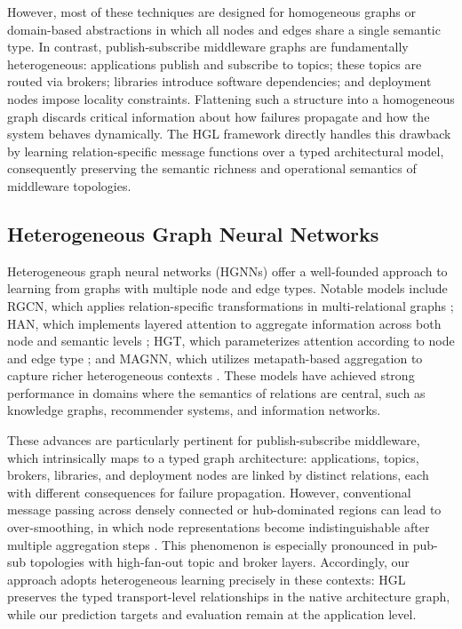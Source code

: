 \documentclass[sigconf,9pt,anonymous]{acmart}
\begin{document}
However, most of these techniques are designed for homogeneous graphs or domain-based abstractions in which all nodes and edges share a single semantic type. In contrast, publish-subscribe middleware graphs are fundamentally heterogeneous: applications publish and subscribe to topics; these topics are routed via brokers; libraries introduce software dependencies; and deployment nodes impose locality constraints. Flattening such a structure into a homogeneous graph discards critical information about how failures propagate and how the system behaves dynamically. The HGL framework directly handles this drawback by learning relation-specific message functions over a typed architectural model, consequently preserving the semantic richness and operational semantics of middleware topologies.

\subsection{Heterogeneous Graph Neural Networks}

Heterogeneous graph neural networks (HGNNs) offer a well-founded approach to learning from graphs with multiple node and edge types. Notable models include RGCN, which applies relation-specific transformations in multi-relational graphs \cite{schlichtkrull2018rgcn}; HAN, which implements layered attention to aggregate information across both node and semantic levels \cite{wang2019han}; HGT, which parameterizes attention according to node and edge type \cite{hu2020hgt}; and MAGNN, which utilizes metapath-based aggregation to capture richer heterogeneous contexts \cite{fu2020magnn}. These models have achieved strong performance in domains where the semantics of relations are central, such as knowledge graphs, recommender systems, and information networks.

These advances are particularly pertinent for publish-subscribe middleware, which intrinsically maps to a typed graph architecture: applications, topics, brokers, libraries, and deployment nodes are linked by distinct relations, each with different consequences for failure propagation. However, conventional message passing across densely connected or hub-dominated regions can lead to over-smoothing, in which node representations become indistinguishable after multiple aggregation steps \cite{li2018deeper}. This phenomenon is especially pronounced in pub-sub topologies with high-fan-out topic and broker layers. Accordingly, our approach adopts heterogeneous learning precisely in these contexts: HGL preserves the typed transport-level relationships in the native architecture graph, while our prediction targets and evaluation remain at the application level.
\end{document}
